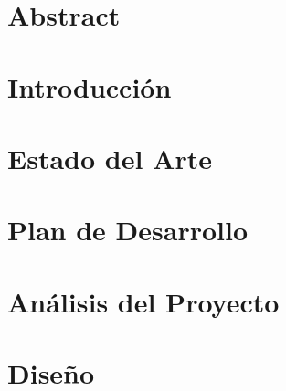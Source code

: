 \documentclass[openright,twoside,10pt]{book}
\begin{document}
\chapter*{Abstract} %
\begin{flushleft}


\end{flushleft}

\tableofcontents %

\cleardoublepage
{} %
\listoffigures %

\cleardoublepage
{} %

\renewcommand\listtablename{Índice de Tablas}
\listoftables %
\clearpage

\chapter{Introducción}\label{cap.introduccion}


\chapter{Estado del Arte}\label{cap.arte}


\chapter{Plan de Desarrollo}\label{cap.desarrollo}


\chapter{Análisis del Proyecto}\label{cap.analisis}


\chapter{Diseño}
\label{cap.diseño}

\end{document}
